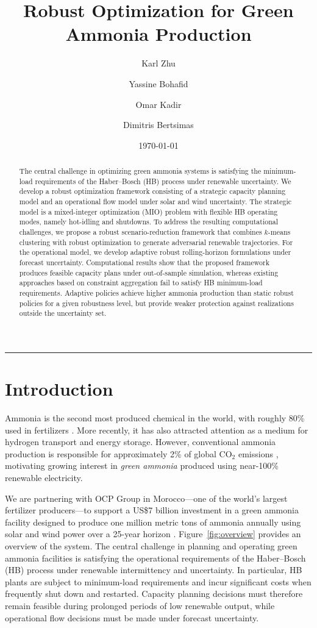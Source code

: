 \documentclass[11pt, letter]{article}
\title{Robust Optimization for Green Ammonia Production}
\author[1]{Karl Zhu}
\author[2]{Yassine Bohafid}
\author[2]{Omar Kadir}
\author[1]{Dimitris Bertsimas}
\affil[1]{Operations Research Center, Massachusetts Institute of Technology, Cambridge, MA, USA}
\affil[2]{OCP Group, Casablanca, Morocco}
\date{\today}
\begin{document}
\maketitle

\begin{abstract}
The central challenge in optimizing green ammonia systems is satisfying the minimum-load requirements of the Haber–Bosch (HB) process under renewable uncertainty. We develop a robust optimization framework consisting of a strategic capacity planning model and an operational flow model under solar and wind uncertainty. The strategic model is a mixed-integer optimization (MIO) problem with flexible HB operating modes, namely hot-idling and shutdowns. To address the resulting computational challenges, we propose a robust scenario-reduction framework that combines $k$-means clustering with robust optimization to generate adversarial renewable trajectories. For the operational model, we develop adaptive robust rolling-horizon formulations under forecast uncertainty. Computational results show that the proposed framework produces feasible capacity plans under out-of-sample simulation, whereas existing approaches based on constraint aggregation fail to satisfy HB minimum-load requirements. Adaptive policies achieve higher ammonia production than static robust policies for a given robustness level, but provide weaker protection against realizations outside the uncertainty set.
\end{abstract}
\noindent\rule{\textwidth}{0.4pt}


\normalsize
\section{Introduction}

Ammonia is the second most produced chemical in the world, with roughly 80\% used in fertilizers \citep{aziz_ammonia_2020}. More recently, it has also attracted attention as a medium for hydrogen transport and energy storage. However, conventional ammonia production is responsible for approximately 2\% of global CO$_2$ emissions \citep{liu_life_2020}, motivating growing interest in \textit{green ammonia} produced using near-100\% renewable electricity.

We are partnering with OCP Group in Morocco—one of the world's largest fertilizer producers—to support a US\$7 billion investment in a green ammonia facility designed to produce one million metric tons of ammonia annually using solar and wind power over a 25-year horizon \citep{atchison_ocp_2023}. Figure~\ref{fig:overview} provides an overview of the system. The central challenge in planning and operating green ammonia facilities is satisfying the operational requirements of the Haber–Bosch (HB) process under renewable intermittency and uncertainty. In particular, HB plants are subject to minimum-load requirements and incur significant costs when frequently shut down and restarted. Capacity planning decisions must therefore remain feasible during prolonged periods of low renewable output, while operational flow decisions must be made under forecast uncertainty.
\end{document}
